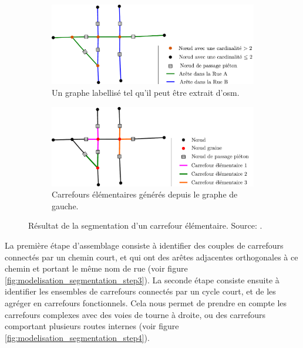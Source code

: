 \begin{figure}[ht]
    \centering
    \begin{subfigure}[t]{.49\linewidth}
        \includegraphics[width=\textwidth]{images/modelisation/segmentation/segmentation-step1.pdf}
        \caption{Un graphe labellisé tel qu'il peut être extrait d'\gls{osm}.\label{fig:modelisation_segmentation_step1}}
    \end{subfigure}
    \hfill
    \begin{subfigure}[t]{.49\linewidth}
        \includegraphics[width=\textwidth]{images/modelisation/segmentation/segmentation-step2.pdf}
        \caption{Carrefours élémentaires générés depuis le graphe de gauche. \label{fig:modelisation_segmentation_step2}}
    \end{subfigure}
    \caption[Segmentation d'un carrefour élémentaire]{Résultat de la segmentation d'un carrefour élémentaire. Source: \citep{Favreau2022}.}
    \label{fig:modelisation_segmentation_step1&2}
\end{figure}

\newpar{}

La première étape d'assemblage consiste à identifier des couples de carrefours connectés par un chemin court, et qui ont des arêtes adjacentes orthogonales à ce chemin et portant le même nom de rue (voir figure \ref{fig:modelisation_segmentation_step3}). La seconde étape consiste ensuite à identifier les ensembles de carrefours connectés par un cycle court, et de les agréger en carrefours fonctionnels. Cela nous permet de prendre en compte les carrefours complexes avec des voies de tourne à droite, ou des carrefours comportant plusieurs routes internes (voir figure \ref{fig:modelisation_segmentation_step4}).


